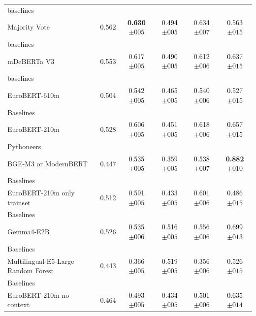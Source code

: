 \begin{tabularx}{\textwidth}{X | c c c c c}
baselines\\\subcatarrow{}Majority Vote & \textcolor{Black}{0.562} & \textbf{\textcolor{BrickRed}{0.630$\pm{}005$}} & \textcolor{Black}{0.494$\pm{}005$} & \textcolor{BrickRed}{0.634$\pm{}007$} & \textcolor{White!50!NavyBlue}{0.563$\pm{}015$} \\
baselines\\\subcatarrow{}mDeBERTa V3 & \textcolor{Black}{0.553} & \textcolor{White!50!BrickRed}{0.617$\pm{}005$} & \textcolor{Black}{0.490$\pm{}005$} & \textcolor{White!50!BrickRed}{0.612$\pm{}006$} & \textcolor{Black}{0.637$\pm{}015$} \\
baselines\\\subcatarrow{}EuroBERT-610m & \textcolor{White!50!NavyBlue}{0.504} & \textcolor{Black}{0.542$\pm{}005$} & \textcolor{White!50!NavyBlue}{0.465$\pm{}005$} & \textcolor{Black}{0.540$\pm{}006$} & \textcolor{NavyBlue}{0.527$\pm{}015$} \\
Baselines\\\subcatarrow{}EuroBERT-210m & \textcolor{White!50!NavyBlue}{0.528} & \textcolor{White!50!BrickRed}{0.606$\pm{}005$} & \textcolor{White!50!NavyBlue}{0.451$\pm{}005$} & \textcolor{White!50!BrickRed}{0.618$\pm{}006$} & \textcolor{Black}{0.657$\pm{}015$} \\
Pythoneers\\\subcatarrow{}BGE-M3 or ModernBERT & \textcolor{NavyBlue}{0.447} & \textcolor{Black}{0.535$\pm{}005$} & \textcolor{NavyBlue}{0.359$\pm{}005$} & \textcolor{Black}{0.538$\pm{}007$} & \textbf{\textcolor{BrickRed}{0.882$\pm{}010$}} \\
Baselines\\\subcatarrow{}EuroBERT-210m only trainset & \textcolor{White!50!NavyBlue}{0.512} & \textcolor{White!50!BrickRed}{0.591$\pm{}005$} & \textcolor{White!50!NavyBlue}{0.433$\pm{}005$} & \textcolor{White!50!BrickRed}{0.601$\pm{}006$} & \textcolor{NavyBlue}{0.486$\pm{}015$} \\
Baselines\\\subcatarrow{}Gemma4-E2B & \textcolor{White!50!NavyBlue}{0.526} & \textcolor{Black}{0.535$\pm{}006$} & \textcolor{Black}{0.516$\pm{}005$} & \textcolor{White!50!BrickRed}{0.556$\pm{}006$} & \textcolor{Black}{0.699$\pm{}013$} \\
Baselines\\\subcatarrow{}Multilingual-E5-Large Random Forest & \textcolor{NavyBlue}{0.443} & \textcolor{NavyBlue}{0.366$\pm{}005$} & \textcolor{Black}{0.519$\pm{}005$} & \textcolor{NavyBlue}{0.356$\pm{}006$} & \textcolor{NavyBlue}{0.526$\pm{}015$} \\
Baselines\\\subcatarrow{}EuroBERT-210m no context & \textcolor{NavyBlue}{0.464} & \textcolor{Black}{0.493$\pm{}005$} & \textcolor{White!50!NavyBlue}{0.434$\pm{}005$} & \textcolor{Black}{0.501$\pm{}006$} & \textcolor{Black}{0.635$\pm{}014$} \\
\hline
\end{tabularx}